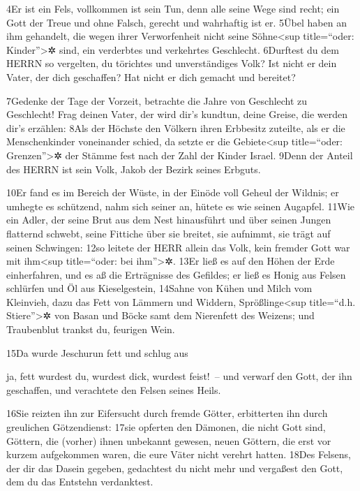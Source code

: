 4Er ist ein Fels, vollkommen ist sein Tun, denn alle seine Wege sind
recht; ein Gott der Treue und ohne Falsch, gerecht und wahrhaftig ist
er. 5Übel haben an ihm gehandelt, die wegen ihrer Verworfenheit nicht
seine Söhne\textless sup title=``oder: Kinder''\textgreater✲ sind, ein
verderbtes und verkehrtes Geschlecht. 6Durftest du dem HERRN so
vergelten, du törichtes und unverständiges Volk? Ist nicht er dein
Vater, der dich geschaffen? Hat nicht er dich gemacht und bereitet?

7Gedenke der Tage der Vorzeit, betrachte die Jahre von Geschlecht zu
Geschlecht! Frag deinen Vater, der wird dir's kundtun, deine Greise, die
werden dir's erzählen: 8Als der Höchste den Völkern ihren Erbbesitz
zuteilte, als er die Menschenkinder voneinander schied, da setzte er die
Gebiete\textless sup title=``oder: Grenzen''\textgreater✲ der Stämme
fest nach der Zahl der Kinder Israel. 9Denn der Anteil des HERRN ist
sein Volk, Jakob der Bezirk seines Erbguts.

10Er fand es im Bereich der Wüste, in der Einöde voll Geheul der
Wildnis; er umhegte es schützend, nahm sich seiner an, hütete es wie
seinen Augapfel. 11Wie ein Adler, der seine Brut aus dem Nest
hinausführt und über seinen Jungen flatternd schwebt, seine Fittiche
über sie breitet, sie aufnimmt, sie trägt auf seinen Schwingen: 12so
leitete der HERR allein das Volk, kein fremder Gott war mit
ihm\textless sup title=``oder: bei ihm''\textgreater✲. 13Er ließ es auf
den Höhen der Erde einherfahren, und es aß die Erträgnisse des Gefildes;
er ließ es Honig aus Felsen schlürfen und Öl aus Kieselgestein, 14Sahne
von Kühen und Milch vom Kleinvieh, dazu das Fett von Lämmern und
Widdern, Sprößlinge\textless sup title=``d.h. Stiere''\textgreater✲ von
Basan und Böcke samt dem Nierenfett des Weizens; und Traubenblut trankst
du, feurigen Wein.

15Da wurde Jeschurun fett und schlug aus

ja, fett wurdest du, wurdest dick, wurdest feist!~-- und verwarf den
Gott, der ihn geschaffen, und verachtete den Felsen seines Heils.

16Sie reizten ihn zur Eifersucht durch fremde Götter, erbitterten ihn
durch greulichen Götzendienst: 17sie opferten den Dämonen, die nicht
Gott sind, Göttern, die (vorher) ihnen unbekannt gewesen, neuen Göttern,
die erst vor kurzem aufgekommen waren, die eure Väter nicht verehrt
hatten. 18Des Felsens, der dir das Dasein gegeben, gedachtest du nicht
mehr und vergaßest den Gott, dem du das Entstehn verdanktest.

